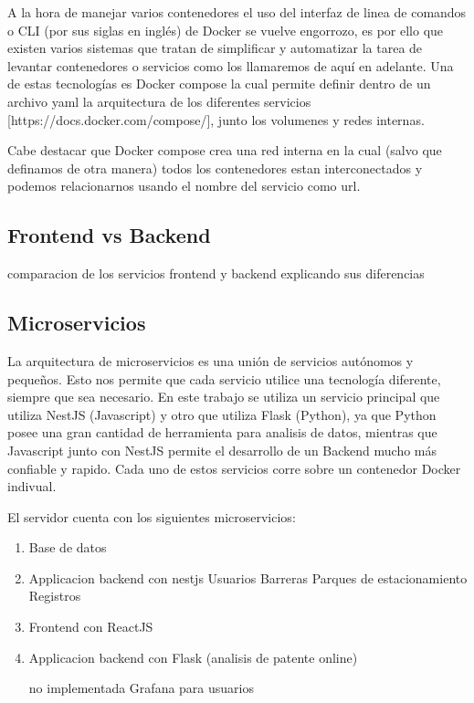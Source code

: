 A la hora de manejar varios contenedores el uso del interfaz de linea de comandos o CLI (por sus siglas en inglés) de Docker se vuelve engorrozo, es por ello que existen varios sistemas que tratan de simplificar y automatizar la tarea de levantar contenedores o servicios como los llamaremos de aquí en adelante. Una de estas tecnologías es Docker compose la cual permite definir dentro de un archivo yaml la arquitectura de los diferentes servicios [https://docs.docker.com/compose/], junto los volumenes y redes internas.

Cabe destacar que Docker compose crea una red interna en la cual (salvo que definamos de otra manera) todos los contenedores estan interconectados y podemos relacionarnos usando el nombre del servicio como url.

\subsection{Frontend vs Backend}

comparacion de los servicios frontend y backend explicando sus diferencias \\


\subsection{Microservicios}

La arquitectura de microservicios es una unión de servicios autónomos y pequeños. Esto nos permite que cada servicio utilice una tecnología diferente, siempre que sea necesario. En este trabajo se utiliza un servicio principal que utiliza NestJS (Javascript) y otro que utiliza Flask (Python), ya que Python posee una gran cantidad de herramienta para analisis de datos, mientras que Javascript junto con NestJS permite el desarrollo de un Backend mucho más confiable y rapido. Cada uno de estos servicios corre sobre un contenedor Docker indivual.

El servidor cuenta con los siguientes microservicios:

\begin{enumerate}
        \item Base de datos
        \item Applicacion backend con nestjs
              \subitem Usuarios
              \subitem Barreras
              \subitem Parques de estacionamiento
              \subitem Registros
        \item Frontend con ReactJS
        \item Applicacion backend con Flask (analisis de patente online)
        \item [no implementada] Grafana para usuarios
\end{enumerate}


